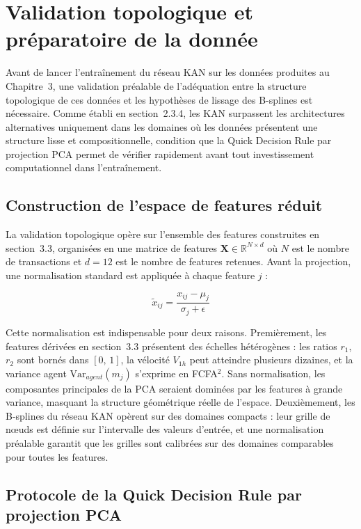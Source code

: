 \documentclass[11pt,a4paper,oneside]{report}
\theoremstyle{definition}
\theoremstyle{remark}
\begin{document}
\section{Validation topologique et préparatoire de la donnée}

Avant de lancer l'entraînement du réseau KAN sur les données produites au Chapitre~3, une validation préalable de l'adéquation entre la structure topologique de ces données et les hypothèses de lissage des B-splines est nécessaire. Comme établi en section~2.3.4, les KAN surpassent les architectures alternatives uniquement dans les domaines où les données présentent une structure lisse et compositionnelle, condition que la Quick Decision Rule par projection PCA permet de vérifier rapidement avant tout investissement computationnel dans l'entraînement.

\subsection{Construction de l'espace de features réduit}

La validation topologique opère sur l'ensemble des features construites en section~3.3, organisées en une matrice de features $\mathbf{X} \in \mathbb{R}^{N \times d}$ où $N$ est le nombre de transactions et $d = 12$ est le nombre de features retenues. Avant la projection, une normalisation standard est appliquée à chaque feature $j$ :

\begin{equation}
    \tilde{x}_{ij} = \frac{x_{ij} - \mu_j}{\sigma_j + \epsilon}
\end{equation}

Cette normalisation est indispensable pour deux raisons. Premièrement, les features dérivées en section~3.3 présentent des échelles hétérogènes : les ratios $r_1$, $r_2$ sont bornés dans $[0,\,1]$, la vélocité $V_{1h}$ peut atteindre plusieurs dizaines, et la variance agent $\text{Var}_{agent}(m_j)$ s'exprime en FCFA$^2$. Sans normalisation, les composantes principales de la PCA seraient dominées par les features à grande variance, masquant la structure géométrique réelle de l'espace. Deuxièmement, les B-splines du réseau KAN opèrent sur des domaines compacts : leur grille de nœuds est définie sur l'intervalle des valeurs d'entrée, et une normalisation préalable garantit que les grilles sont calibrées sur des domaines comparables pour toutes les features.

\subsection{Protocole de la Quick Decision Rule par projection PCA}
\end{document}
